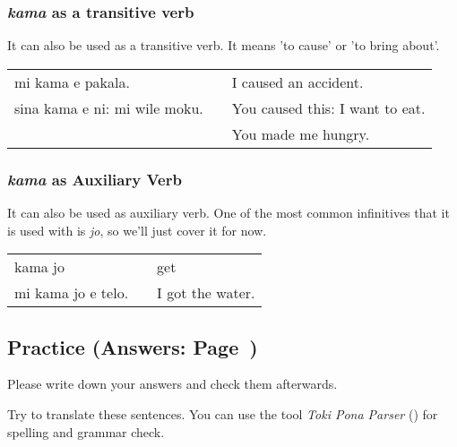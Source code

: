 %
\subsubsection*{\textit{kama} as a transitive verb}
%
It can also be used as a transitive verb. 
It means 'to cause' or 'to bring about'.

\begin{supertabular}{p{5,5cm}|ll}
mi kama e pakala. && I caused an accident. \\
sina kama e ni: mi wile moku. && You caused this: I want to eat. \\ && You made me hungry. \\
\end{supertabular} 
%
\subsubsection*{\textit{kama} as Auxiliary Verb}
%
It can also be used as auxiliary verb. 
One of the most common infinitives that it is used with is \textit{jo}, so we'll just cover it for now. 

\begin{supertabular}{p{5,5cm}|ll}
kama jo && get \\
mi kama jo e telo. && I got the water. \\
\end{supertabular} 














%
\newpage
\subsection*{Practice (Answers: Page~\pageref{'prepositional_objects'})}
%
Please write down your answers and check them afterwards. 

Try to translate these sentences. 
You can use the tool \textit{Toki Pona Parser} (\cite{www:rowa:02}) for spelling and grammar check. 


